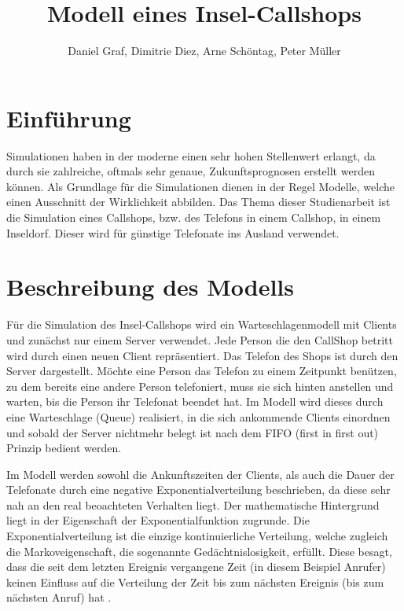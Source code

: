 

\title{Modell eines Insel-Callshops}
\providecommand{\subtitle}[1]{}
\subtitle{2. Projekt zu Modellierung und Simulation}
\author{Daniel Graf, Dimitrie Diez, Arne Schöntag, Peter Müller}
\date{}



\maketitle

\tableofcontents
\section{Einführung}
Simulationen haben in der moderne einen sehr hohen Stellenwert erlangt, da durch sie zahlreiche, oftmals sehr genaue, Zukunftsprognosen erstellt werden können. Als Grundlage für die Simulationen dienen in der Regel Modelle, welche einen Ausschnitt der Wirklichkeit abbilden. Das Thema dieser Studienarbeit ist die Simulation eines Callshops, bzw. des Telefons in einem Callshop, in einem Inseldorf. Dieser wird für günstige Telefonate ins Ausland verwendet.

\section{Beschreibung des Modells}
Für die Simulation des Insel-Callshops wird ein Warteschlagenmodell mit Clients und zunächst nur einem Server verwendet. Jede Person die den CallShop betritt wird durch einen neuen Client repräsentiert. Das Telefon des Shops ist durch den Server dargestellt. Möchte eine Person das Telefon zu einem Zeitpunkt benützen, zu dem bereits eine andere Person telefoniert, muss sie sich hinten anstellen und warten, bis die Person ihr Telefonat beendet hat. Im Modell wird dieses durch eine Warteschlage (Queue) realisiert, in die sich ankommende Clients einordnen und sobald der Server nichtmehr belegt ist nach dem FIFO (first in first out) Prinzip bedient werden.

Im Modell werden sowohl die Ankunftszeiten der Clients, als auch die Dauer der Telefonate durch eine negative Exponentialverteilung beschrieben, da diese sehr nah an den real beoachteten Verhalten liegt. Der mathematische Hintergrund liegt in der Eigenschaft der Exponentialfunktion zugrunde. Die Exponentialverteilung ist die einzige kontinuierliche Verteilung, welche zugleich die Markoveigenschaft, die sogenannte Gedächtnislosigkeit, erfüllt. Diese besagt, dass die seit dem letzten Ereignis vergangene Zeit (in diesem Beispiel Anrufer) keinen Einfluss auf die Verteilung der Zeit bis zum nächsten Ereignis (bis zum nächsten Anruf) hat \cite{ExpoVert}.

